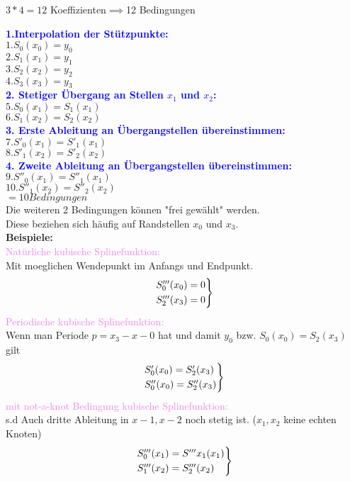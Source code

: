 \documentclass[../ZF_HM2.tex]{subfiles}
\begin{document}
$3*4 = 12$ Koeffizienten$\implies $12 Bedingungen

\textbf{\textcolor{blue}{1.Interpolation der Stützpunkte:}\\}
$1. S_0(x_0) = y_0$\\
$2. S_1(x_1) = y_1$\\
$3. S_2(x_2) = y_2$\\
$4. S_3(x_3) = y_3$\\

\textbf{\textcolor{blue}{2. Stetiger Übergang an Stellen $x_1$ und $x_2$:}\\}
$5. S_0(x_1) =S_1(x_1)$\\
$6. S_1(x_2) =S_2(x_2)$\\

\textbf{\textcolor{blue}{3. Erste Ableitung an Übergangstellen übereinstimmen:}\\}
$7. S'_0(x_1) =S'_1(x_1)$\\
$8. S'_1(x_2) =S'_2(x_2)$\\

\textbf{\textcolor{blue}{4. Zweite Ableitung an Übergangstellen übereinstimmen:}\\}
$9. S''_0(x_1) =S''_1(x_1)$\\
$10. S''_1(x_2) =S''_2(x_2)$\\

$= 10 Bedingungen$\\

Die weiteren 2 Bedingungen können "frei gewählt" werden.\\
Diese beziehen sich häufig auf Randstellen $x_0$ und $x_3$.\\
\textbf{Beispiele:\\}
\textcolor{violet}{Natürliche kubische Splinefunktion:}\\
Mit moeglichen Wendepunkt im Anfangs und Endpunkt.\\
\[
\begin{rcases*}
S'''_0(x_0) = 0\\
S'''_2(x_3) = 0\\
\end{rcases*} 
\]
\textcolor{violet}{Periodische kubische Splinefunktion:\\}
Wenn man Periode $p=x_3-x-0$ hat und damit $y_0$ bzw. $S_0(x_0) = S_2(x_3)$ gilt
\[
\begin{rcases*}
S'_0(x_0) = S'_2(x_3) \\
S''_0(x_0) = S''_2(x_3) \\
\end{rcases*} 
\]
\textcolor{violet}{mit not-a-knot Bedingung kubische Splinefunktion:\\}
s.d Auch dritte Ableitung in $x-1,x-2$ noch stetig ist. ($x_1,x_2$ keine echten Knoten)
\[
\begin{rcases*}
S'''_0(x_1) = S'''x_1(x_1) \\
S'''_1(x_2) = S'''_2(x_2) \\
\end{rcases*} 
\]
\end{document}
